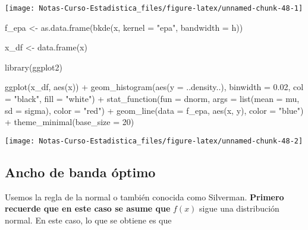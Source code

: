 \documentclass[
  12pt,
]{book}
\newenvironment{Shaded}{\begin{snugshade}}{\end{snugshade}}
\newcommand{\AttributeTok}[1]{\textcolor[rgb]{0.77,0.63,0.00}{#1}}
\newcommand{\DecValTok}[1]{\textcolor[rgb]{0.00,0.00,0.81}{#1}}
\newcommand{\FloatTok}[1]{\textcolor[rgb]{0.00,0.00,0.81}{#1}}
\newcommand{\FunctionTok}[1]{\textcolor[rgb]{0.00,0.00,0.00}{#1}}
\newcommand{\NormalTok}[1]{#1}
\newcommand{\OtherTok}[1]{\textcolor[rgb]{0.56,0.35,0.01}{#1}}
\newcommand{\SpecialCharTok}[1]{\textcolor[rgb]{0.00,0.00,0.00}{#1}}
\newcommand{\StringTok}[1]{\textcolor[rgb]{0.31,0.60,0.02}{#1}}
\theoremstyle{definition}
\theoremstyle{definition}
\theoremstyle{definition}
\theoremstyle{definition}
\theoremstyle{remark}
\begin{document}
\begin{center}\texttt{[image: Notas-Curso-Estadistica\_files/figure-latex/unnamed-chunk-48-1]} \end{center}

\begin{Shaded}
\begin{Highlighting}[]
\NormalTok{f\_epa }\OtherTok{\textless{}{-}} \FunctionTok{as.data.frame}\NormalTok{(}\FunctionTok{bkde}\NormalTok{(x, }\AttributeTok{kernel =} \StringTok{"epa"}\NormalTok{, }\AttributeTok{bandwidth =}\NormalTok{ h))}

\NormalTok{x\_df }\OtherTok{\textless{}{-}} \FunctionTok{data.frame}\NormalTok{(x)}

\FunctionTok{library}\NormalTok{(ggplot2)}

\FunctionTok{ggplot}\NormalTok{(x\_df, }\FunctionTok{aes}\NormalTok{(x)) }\SpecialCharTok{+} \FunctionTok{geom\_histogram}\NormalTok{(}\FunctionTok{aes}\NormalTok{(}\AttributeTok{y =}\NormalTok{ ..density..),}
    \AttributeTok{binwidth =} \FloatTok{0.02}\NormalTok{, }\AttributeTok{col =} \StringTok{"black"}\NormalTok{, }\AttributeTok{fill =} \StringTok{"white"}\NormalTok{) }\SpecialCharTok{+}
    \FunctionTok{stat\_function}\NormalTok{(}\AttributeTok{fun =}\NormalTok{ dnorm, }\AttributeTok{args =} \FunctionTok{list}\NormalTok{(}\AttributeTok{mean =}\NormalTok{ mu,}
        \AttributeTok{sd =}\NormalTok{ sigma), }\AttributeTok{color =} \StringTok{"red"}\NormalTok{) }\SpecialCharTok{+} \FunctionTok{geom\_line}\NormalTok{(}\AttributeTok{data =}\NormalTok{ f\_epa,}
    \FunctionTok{aes}\NormalTok{(x, y), }\AttributeTok{color =} \StringTok{"blue"}\NormalTok{) }\SpecialCharTok{+} \FunctionTok{theme\_minimal}\NormalTok{(}\AttributeTok{base\_size =} \DecValTok{20}\NormalTok{)}
\end{Highlighting}
\end{Shaded}

\begin{center}\texttt{[image: Notas-Curso-Estadistica\_files/figure-latex/unnamed-chunk-48-2]} \end{center}

\hypertarget{ancho-de-banda-uxf3ptimo-1}{%
\subsection{Ancho de banda óptimo}\label{ancho-de-banda-uxf3ptimo-1}}

Usemos la regla de la normal o también conocida como Silverman.
\textbf{Primero recuerde que en este caso se asume que} \(f(x)\) sigue una
distribución normal. En este caso, lo que se obtiene es que
\end{document}
